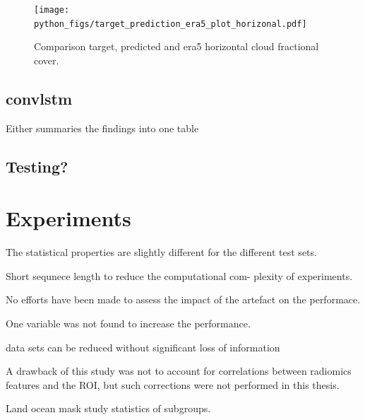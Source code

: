 \begin{figure}[ht]
    \centering
    \texttt{[image: python\_figs/target\_prediction\_era5\_plot\_horizonal.pdf]}
    \caption{Comparison target, predicted and era5 horizontal cloud fractional cover.}
    \label{fig:target_predict_era5_vertical}
\end{figure}

\subsection{\acrlong{convlstm} }
Either summaries the findings into one table 


\subsection{Testing?}

\section{Experiments}



The statistical properties are slightly different for the different test sets.  

Short sequnece length to reduce the computational com-
plexity of experiments. 

No efforts have been made to assess the impact of the artefact on the performace.

One variable was not found to increase the performance.


data sets can be reduced without significant loss of information

A drawback of this study was not to account for correlations between radiomics features and the ROI, but such corrections were
not performed in this thesis.

Land ocean mask study statistics of subgroups.


